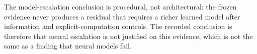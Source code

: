 The model-escalation conclusion is procedural, not architectural: the frozen evidence never produces a residual that requires a richer learned model after information and explicit-computation controls. The recorded conclusion is therefore that neural escalation is not justified on this evidence, which is not the same as a finding that neural models fail.

